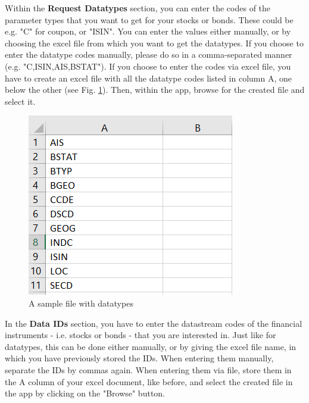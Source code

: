 Within the \textbf{Request Datatypes} section, you can enter the codes of the parameter types that you want to get for your stocks or bonds. These could be e.g. "C" for coupon, or "ISIN". You can enter the values either manually, or by choosing the excel file from which you want to get the datatypes. If you choose to enter the datatype codes manually, please do so in a comma-separated manner (e.g. "C,ISIN,AIS,BSTAT"). If you choose to enter the codes via excel file, you have to create an excel file with all the datatype codes listed in column A, one below the other (see Fig. \ref{fig:file-datatypes}). Then, within the app, browse for the created file and select it.

\begin{figure}[h]
	\centering
	\includegraphics[width=1.1\linewidth]{figures/enter-datatypes.png}
	\caption{A sample file with datatypes}
	\label{fig:file-datatypes}
\end{figure}

In the \textbf{Data IDs} section, you have to enter the datastream codes of the financial instruments - i.e. stocks or bonds - that you are interested in. Just like for datatypes, this can be done either manually, or by giving the excel file name, in which you have previously stored the IDs. When entering them manually, separate the IDs by commas again. When entering them via file, store them in the A column of your excel document, like before, and select the created file in the app by clicking on the "Browse" button. \\

